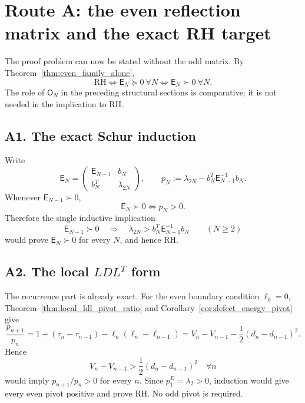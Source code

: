 \documentclass[11pt]{amsart}
\numberwithin{equation}{section}
\theoremstyle{plain}
\theoremstyle{definition}
\theoremstyle{remark}
\newcommand{\RH}{\mathrm{RH}}
\newcommand{\E}{\mathsf E}
\newcommand{\Omat}{\mathsf O}
\begin{document}
\section{Route A: the even reflection matrix and the exact RH target}
\label{sec:route_A_even}

The proof problem can now be stated without the odd matrix.  By
Theorem~\ref{thm:even_family_alone},
\begin{equation}
\boxed{
\RH
\Longleftrightarrow
\E_N\succeq0\ \forall N
\Longleftrightarrow
\E_N\succ0\ \forall N.}
\label{eq:routeA_even_equivalence}
\end{equation}
The role of \(\Omat_N\) in the preceding structural sections is comparative; it is not needed in
the implication to RH.

\subsection{A1. The exact Schur induction}
\label{subsec:routeA_schur}

Write
\begin{equation}
\E_N=
\begin{pmatrix}
\E_{N-1}&b_N\\
b_N^T&\lambda_{2N}
\end{pmatrix},
\qquad
p_N:=\lambda_{2N}-b_N^T\E_{N-1}^{-1}b_N.
\label{eq:routeA_block_pivot}
\end{equation}
Whenever \(\E_{N-1}\succ0\),
\begin{equation}
\boxed{
\E_N\succ0
\Longleftrightarrow
p_N>0.}
\label{eq:routeA_schur_equivalence}
\end{equation}
Therefore the single inductive implication
\begin{equation}
\boxed{
\E_{N-1}\succ0
\quad\Longrightarrow\quad
\lambda_{2N}>b_N^T\E_{N-1}^{-1}b_N
\qquad(N\ge2)}
\label{eq:routeA_inverse_schur_target}
\end{equation}
would prove \(\E_N\succ0\) for every \(N\), and hence RH.

\subsection{\texorpdfstring{A2. The local $LDL^T$ form}{A2. The local LDLT form}}
\label{subsec:routeA_local}

The recurrence part is already exact.  For the even boundary condition \(\ell_0=0\),
Theorem~\ref{thm:local_ldl_pivot_ratio} and Corollary~\ref{cor:defect_energy_pivot} give
\begin{equation}
\frac{p_{n+1}}{p_n}
=
1+(\tau_n-\tau_{n-1})
-\ell_n(\ell_n-\ell_{n-1})
=
V_n-V_{n-1}-\frac12(d_n-d_{n-1})^2.
\label{eq:routeA_local_identity}
\end{equation}
Hence
\begin{equation}
\boxed{
V_n-V_{n-1}>
\frac12(d_n-d_{n-1})^2
\quad\forall n}
\label{eq:routeA_local_target}
\end{equation}
would imply \(p_{n+1}/p_n>0\) for every \(n\).  Since \(p_1^E=\lambda_2>0\), induction would
give every even pivot positive and prove RH.  No odd pivot is required.
\end{document}
